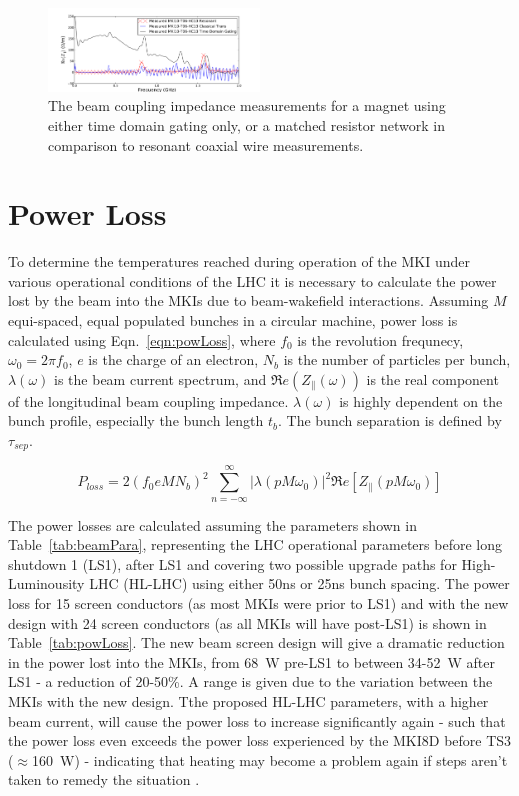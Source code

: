\documentclass[a4paper,
              ]{jacow}
\begin{document}
\begin{figure}
\includegraphics[width=0.5\textwidth]{TUPRI030f5.pdf}
\caption{The beam coupling impedance measurements for a magnet using either time domain gating only, or a matched resistor network in comparison to resonant coaxial wire measurements.}
\label{fig:measComp}
\end{figure}

\section{Power Loss}

To determine the temperatures reached during operation of the MKI under various operational conditions of the LHC it is necessary to calculate the power lost by the beam into the MKIs due to beam-wakefield interactions. Assuming $M$ equi-spaced, equal populated bunches in a circular machine, power loss is calculated using Eqn.~\ref{eqn:powLoss}, where $f_{0}$ is the revolution frequnecy, $\omega_{0}=2\pi f_{0}$, $e$ is the charge of an electron, $N_{b}$ is the number of particles per bunch, $\lambda(\omega)$ is the beam current spectrum, and $\Re{}e(Z_{\parallel}(\omega))$ is the real component of the longitudinal beam coupling impedance. $\lambda(\omega)$ is highly dependent on the bunch profile, especially the bunch length $t_{b}$. The bunch separation is defined by $\tau_{sep}$.

\begin{equation}
P_{loss} = 2 \left( f_{0} e M  N_{b}\right)^{2} \displaystyle\sum\limits_{n = -\infty}^{\infty}  \left| \lambda \left( p M \omega_{0} \right)  \right|^{2} \Re{}e \left[ Z_{\parallel} \left( p M \omega_{0} \right) \right]
\label{eqn:powLoss}
\end{equation}

The power losses are calculated assuming the parameters shown in Table~\ref{tab:beamPara}, representing the LHC operational parameters before long shutdown 1 (LS1), after LS1 and covering two possible upgrade paths for High-Luminousity LHC (HL-LHC) using either 50ns or 25ns bunch spacing. The power loss for 15 screen conductors (as most MKIs were prior to LS1) and with the new design with 24 screen conductors (as all MKIs will have post-LS1) is shown in Table~\ref{tab:powLoss}. The new beam screen design will give a dramatic reduction in the power lost into the MKIs, from 68~W pre-LS1 to between 34-52~W after LS1 - a reduction of 20-50\%. A range is given due to the variation between the MKIs with the new design. Tthe proposed HL-LHC parameters, with a higher beam current, will cause the power loss to increase significantly again - such that the power loss even exceeds the power loss experienced by the MKI8D before TS3 ($\approx$160~W) - indicating that heating may become a problem again if steps aren't taken to remedy the situation \cite{mkiCoolling}.
\end{document}

